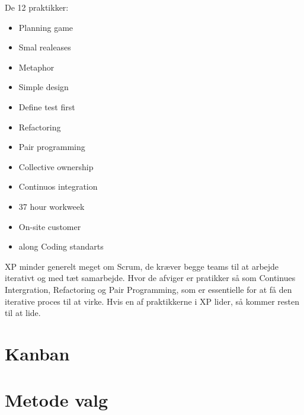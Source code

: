 De 12 praktikker: 



\begin{itemize}
    \item Planning game

    \item Smal realeases
  
    \item Metaphor

    \item Simple design 

    \item Define test first

    \item Refactoring
 
    \item Pair programming

    \item Collective ownership
   
    \item Continuos integration 

    \item 37 hour workweek 

    \item On-site customer 
    
    \item along Coding standarts 


\end{itemize}

XP minder generelt meget om Scrum, de kræver begge teams til at arbejde iterativt og med tæt samarbejde. Hvor de afviger er pratikker så som Continues Intergration, Refactoring og Pair Programming, som er essentielle for at få den iterative proces til at virke. Hvis en af praktikkerne i XP lider, så kommer resten til at lide. 



\section{Kanban}


\section{Metode valg}


 


